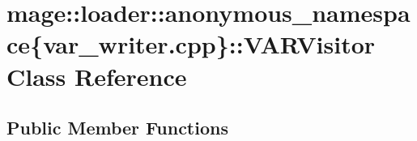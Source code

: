 \hypertarget{classmage_1_1loader_1_1anonymous__namespace_02var__writer_8cpp_03_1_1_v_a_r_visitor}{}\section{mage\+:\+:loader\+:\+:anonymous\+\_\+namespace\{var\+\_\+writer.\+cpp\}\+:\+:V\+A\+R\+Visitor Class Reference}
\label{classmage_1_1loader_1_1anonymous__namespace_02var__writer_8cpp_03_1_1_v_a_r_visitor}
\subsection*{Public Member Functions}
